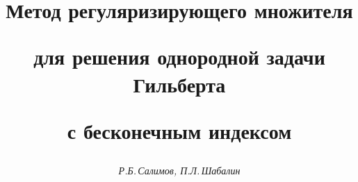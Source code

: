 




%





\newcommand{\im}{\operatorname{Im}}


\newcommand{\re}{\operatorname{Re}}


\newcommand{\tts}[1]{}







\setcounter{page}{76}















\author{\it Р.Б.\,Салимов, П.Л.\,Шабалин}




\title{Метод регуляризирующего множителя


для решения однородной задачи Гильберта


с бесконечным  индексом}





\date{}




\pagestyle{plain} %







\maketitle


